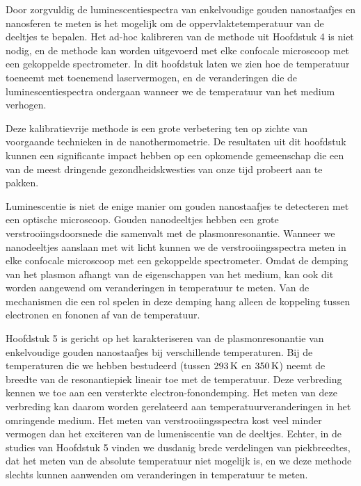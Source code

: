 {Door zorgvuldig de luminescentiespectra van enkelvoudige gouden nanostaafjes en
nanosferen te meten is het mogelijk om de oppervlaktetemperatuur van de deeltjes
te bepalen. Het ad-hoc kalibreren van de methode uit Hoofdstuk 4 is niet nodig,
en de methode kan worden uitgevoerd met elke confocale microscoop met een
gekoppelde spectrometer. In dit hoofdstuk laten we zien hoe de temperatuur
toeneemt met toenemend laservermogen, en de veranderingen die de
luminescentiespectra ondergaan wanneer we de temperatuur van het medium
verhogen.

Deze kalibratievrije methode is een grote verbetering ten op zichte van
voorgaande technieken in de nanothermometrie. De resultaten uit dit hoofdstuk
kunnen een significante impact hebben op een opkomende gemeenschap die een van
de meest dringende gezondheidskwesties van onze tijd probeert aan te pakken.

Luminescentie is niet de enige manier om gouden nanostaafjes te detecteren met
een optische microscoop. Gouden nanodeeltjes hebben een grote
verstrooiingsdoorsnede die samenvalt met de plasmonresonantie. Wanneer we
nanodeeltjes aanslaan met wit licht kunnen we de verstrooiingsspectra meten in
elke confocale microscoop met een gekoppelde spectrometer. Omdat de demping van
het plasmon afhangt van de eigenschappen van het medium, kan ook dit worden
aangewend om veranderingen in temperatuur te meten. Van de mechanismen die een
rol spelen in deze demping hang alleen de koppeling tussen electronen en fononen
af van de temperatuur.

Hoofdstuk 5 is gericht op het karakteriseren van de plasmonresonantie van
enkelvoudige gouden nanostaafjes bij verschillende temperaturen. Bij de
temperaturen die we hebben bestudeerd (tussen $293\,\textrm{K}$ en $350\,\textrm{K}$) neemt de
breedte van de resonantiepiek lineair toe met de temperatuur. Deze verbreding kennen we
toe aan een versterkte electron-fonondemping. Het meten van deze verbreding kan
daarom worden gerelateerd aan temperatuurveranderingen in het omringende medium.
Het meten van verstrooiingsspectra kost veel minder vermogen dan het exciteren
van de lumeniscentie van de deeltjes. Echter, in de studies van Hoofdstuk 5
vinden we dusdanig brede verdelingen van piekbreedtes, dat het meten van de
absolute temperatuur niet mogelijk is, en we deze methode slechts kunnen
aanwenden om veranderingen in temperatuur te meten. }
